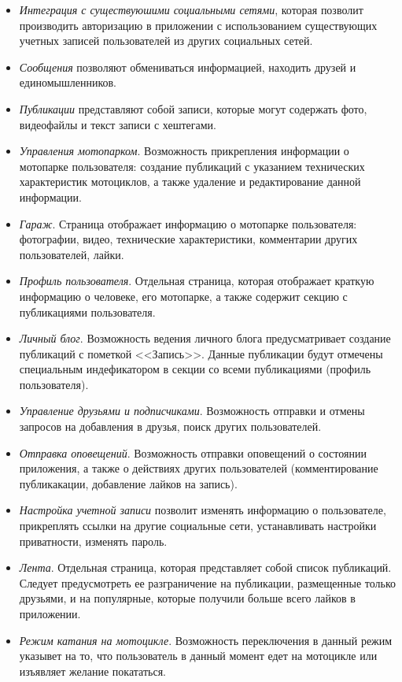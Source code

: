 \begin{itemize}
	\item \emph{Интеграция с существуюшими социальными сетями}, которая позволит производить авторизацию в приложении с использованием существующих учетных записей пользователей из других социальных сетей.
	\item \emph{Сообщения} позволяют обмениваться информацией, находить друзей и единомышленников.
	\item \emph{Публикации} представляют собой записи, которые могут содержать фото, видеофайлы и текст записи с хештегами.
	\item \emph{Управления мотопарком}. Возможность прикрепления информации о мотопарке пользователя: создание публикаций с указанием технических характеристик мотоциклов, а также удаление и редактирование данной информации.
	\item \emph{Гараж}. Страница отображает информацию о мотопарке пользователя: фотографии, видео, технические характеристики, комментарии других пользователей, лайки. 
	\item \emph{Профиль пользователя}. Отдельная страница, которая отображает краткую информацию о человеке, его мотопарке, а также содержит секцию с публикациями пользователя.
	\item \emph{Личный блог}. Возможность ведения личного блога предусматривает создание публикаций с пометкой <<Запись>>. Данные публикации будут отмечены специальным индефикатором в секции со всеми публикациями (профиль пользователя).
	\item \emph{Управление друзьями и подписчиками}. Возможность отправки и отмены запросов на добавления в друзья, поиск других пользователей.
	\item \emph{Отправка оповещений}. Возможность отправки оповещений о состоянии приложения, а также о действиях других пользователей (комментирование публикакации, добавление лайков на запись).
	\item \emph{Настройка учетной записи} позволит изменять информацию о пользователе, прикреплять ссылки на другие социальные сети, устанавливать настройки приватности, изменять пароль.
	\item \emph{Лента}. Отдельная страница, которая представляет собой список публикаций. Следует предусмотреть ее разграничение на публикации, размещенные только друзьями, и на популярные, которые получили больше всего лайков в приложении.
	\item \emph{Режим катания на мотоцикле}. Возможность переключения в данный режим указывет на то, что пользователь в данный момент едет на мотоцикле или изъявляет желание покататься.

\end{itemize}
